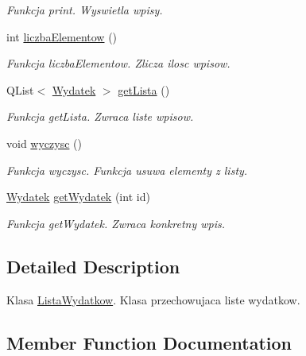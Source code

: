 \begin{DoxyCompactItemize}
\begin{DoxyCompactList}\small\item\em Funkcja print. Wyswietla wpisy. \end{DoxyCompactList}\item 
int \hyperlink{class_lista_wydatkow_a8eae3fd03fe00eef4870ff7b7dd8c8f3}{liczba\+Elementow} ()
\begin{DoxyCompactList}\small\item\em Funkcja liczba\+Elementow. Zlicza ilosc wpisow. \end{DoxyCompactList}\item 
Q\+List$<$ \hyperlink{class_wydatek}{Wydatek} $>$ \hyperlink{class_lista_wydatkow_af720f03b13ff95d45bcf876543fb4f52}{get\+Lista} ()
\begin{DoxyCompactList}\small\item\em Funkcja get\+Lista. Zwraca liste wpisow. \end{DoxyCompactList}\item 
\hypertarget{class_lista_wydatkow_a70fb9dd6af847bf2bb56e2e223e72adb}{}void \hyperlink{class_lista_wydatkow_a70fb9dd6af847bf2bb56e2e223e72adb}{wyczysc} ()\label{class_lista_wydatkow_a70fb9dd6af847bf2bb56e2e223e72adb}

\begin{DoxyCompactList}\small\item\em Funkcja wyczysc. Funkcja usuwa elementy z listy. \end{DoxyCompactList}\item 
\hyperlink{class_wydatek}{Wydatek} \hyperlink{class_lista_wydatkow_a660f862897a33a63b128fdc0761189a1}{get\+Wydatek} (int id)
\begin{DoxyCompactList}\small\item\em Funkcja get\+Wydatek. Zwraca konkretny wpis. \end{DoxyCompactList}\end{DoxyCompactItemize}


\subsection{Detailed Description}
Klasa \hyperlink{class_lista_wydatkow}{Lista\+Wydatkow}. Klasa przechowujaca liste wydatkow. 

\subsection{Member Function Documentation}
\hypertarget{class_lista_wydatkow_a5b6dbb32cc0b8af9bc310204f021ba93}{}

